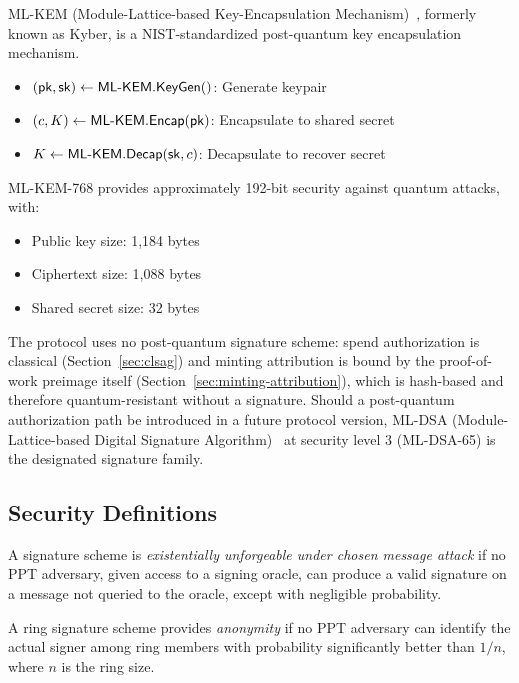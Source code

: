 ML-KEM (Module-Lattice-based Key-Encapsulation Mechanism)~\cite{fips203,kyber},
formerly known as Kyber, is a NIST-standardized post-quantum key
encapsulation mechanism.

\begin{itemize}
  \item $(\mathsf{pk}, \mathsf{sk}) \leftarrow \textsf{ML-KEM}.\mathsf{KeyGen}()$: Generate keypair
  \item $(c, K) \leftarrow \textsf{ML-KEM}.\mathsf{Encap}(\mathsf{pk})$: Encapsulate to shared secret
  \item $K \leftarrow \textsf{ML-KEM}.\mathsf{Decap}(\mathsf{sk}, c)$: Decapsulate to recover secret
\end{itemize}

ML-KEM-768 provides approximately 192-bit security against quantum
attacks, with:
\begin{itemize}
  \item Public key size: 1,184 bytes
  \item Ciphertext size: 1,088 bytes
  \item Shared secret size: 32 bytes
\end{itemize}

The protocol uses no post-quantum signature scheme: spend authorization
is classical (Section~\ref{sec:clsag}) and minting attribution is bound
by the proof-of-work preimage itself
(Section~\ref{sec:minting-attribution}), which is hash-based and
therefore quantum-resistant without a signature. Should a post-quantum
authorization path be introduced in a future protocol version, ML-DSA
(Module-Lattice-based Digital Signature
Algorithm)~\cite{fips204,dilithium} at security level 3 (ML-DSA-65) is
the designated signature family.

\subsection{Security Definitions}

\begin{definition}
A signature scheme is \textit{existentially unforgeable under chosen
message attack} if no PPT adversary, given access to a signing oracle,
can produce a valid signature on a message not queried to the oracle,
except with negligible probability.
\end{definition}

\begin{definition}
A ring signature scheme provides \textit{anonymity} if no PPT adversary
can identify the actual signer among ring members with probability
significantly better than $1/n$, where $n$ is the ring size.
\end{definition}

